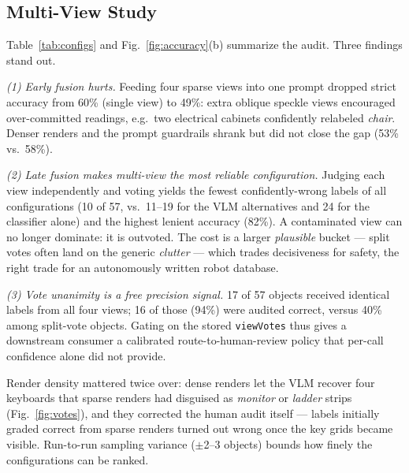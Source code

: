\documentclass[conference]{IEEEtran}
\begin{document}
\subsection{Multi-View Study}
\label{sec:study}
Table~\ref{tab:configs} and Fig.~\ref{fig:accuracy}(b) summarize the
audit. Three findings stand out.

\emph{(1) Early fusion hurts.} Feeding four sparse views into one prompt
dropped strict accuracy from 60\% (single view) to 49\%: extra oblique
speckle views encouraged over-committed readings, e.g.\ two electrical
cabinets confidently relabeled \emph{chair}. Denser renders and the prompt
guardrails shrank but did not close the gap (53\% vs.\ 58\%).

\emph{(2) Late fusion makes multi-view the most reliable configuration.}
Judging each view independently and voting yields the fewest
confidently-wrong labels of all configurations (10 of 57, vs.\ 11--19 for
the VLM alternatives and 24 for the classifier alone) and the highest
lenient accuracy (82\%). A contaminated view can no longer dominate: it is
outvoted. The cost is a larger \emph{plausible} bucket --- split votes
often land on the generic \emph{clutter} --- which trades decisiveness for
safety, the right trade for an autonomously written robot database.

\emph{(3) Vote unanimity is a free precision signal.} 17 of 57 objects
received identical labels from all four views; 16 of those (94\%) were
audited correct, versus 40\% among split-vote objects. Gating on the stored
\texttt{viewVotes} thus gives a downstream consumer a calibrated
route-to-human-review policy that per-call confidence alone did not
provide.

Render density mattered twice over: dense renders let the VLM recover four
keyboards that sparse renders had disguised as \emph{monitor} or
\emph{ladder} strips (Fig.~\ref{fig:votes}), and they corrected the human
audit itself --- labels initially graded correct from sparse renders turned
out wrong once the key grids became visible. Run-to-run sampling variance
($\pm$2--3 objects) bounds how finely the configurations can be ranked.
\end{document}
